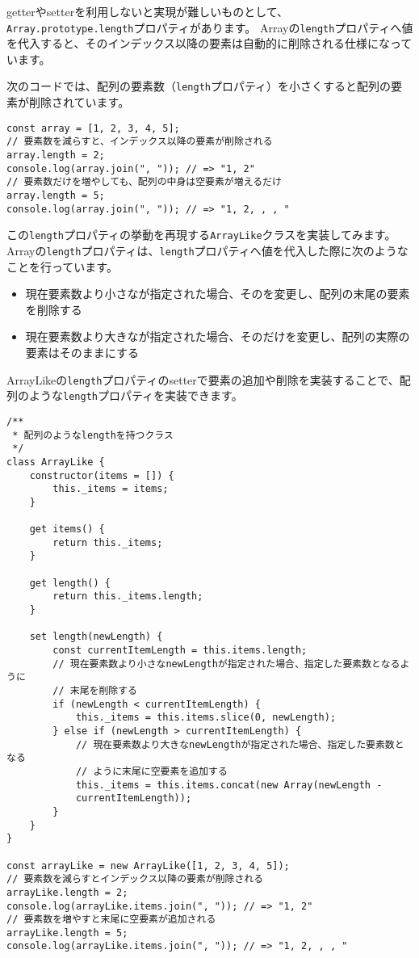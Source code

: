 getterやsetterを利用しないと実現が難しいものとして、\texttt{Array.prototype.length}プロパティがあります。
Arrayの\texttt{length}プロパティへ値を代入すると、そのインデックス以降の要素は自動的に削除される仕様になっています。

次のコードでは、配列の要素数（\texttt{length}プロパティ）を小さくすると配列の要素が削除されています。

\enlargethispage{\baselineskip}\begin{lstlisting}
const array = [1, 2, 3, 4, 5];
// 要素数を減らすと、インデックス以降の要素が削除される
array.length = 2;
console.log(array.join(", ")); // => "1, 2"
// 要素数だけを増やしても、配列の中身は空要素が増えるだけ
array.length = 5;
console.log(array.join(", ")); // => "1, 2, , , "
\end{lstlisting}

この\texttt{length}プロパティの挙動を再現する\texttt{ArrayLike}クラスを実装してみます。
Arrayの\texttt{length}プロパティは、\texttt{length}プロパティへ値を代入した際に次のようなことを行っています。

\begin{itemize}
\item
  現在要素数より小さな\textbf{}が指定された場合、その\textbf{}を変更し、配列の末尾の要素を削除する
\item
  現在要素数より大きな\textbf{}が指定された場合、その\textbf{}だけを変更し、配列の実際の要素はそのままにする
\end{itemize}

ArrayLikeの\texttt{length}プロパティのsetterで要素の追加や削除を実装することで、配列のような\texttt{length}プロパティを実装できます。

\enlargethispage{\baselineskip}\begin{lstlisting}
/**
 * 配列のようなlengthを持つクラス
 */
class ArrayLike {
    constructor(items = []) {
        this._items = items;
    }

    get items() {
        return this._items;
    }

    get length() {
        return this._items.length;
    }

    set length(newLength) {
        const currentItemLength = this.items.length;
        // 現在要素数より小さなnewLengthが指定された場合、指定した要素数となるように
        // 末尾を削除する
        if (newLength < currentItemLength) {
            this._items = this.items.slice(0, newLength);
        } else if (newLength > currentItemLength) {
            // 現在要素数より大きなnewLengthが指定された場合、指定した要素数となる
            // ように末尾に空要素を追加する
            this._items = this.items.concat(new Array(newLength - 
            currentItemLength));
        }
    }
}

const arrayLike = new ArrayLike([1, 2, 3, 4, 5]);
// 要素数を減らすとインデックス以降の要素が削除される
arrayLike.length = 2;
console.log(arrayLike.items.join(", ")); // => "1, 2"
// 要素数を増やすと末尾に空要素が追加される
arrayLike.length = 5;
console.log(arrayLike.items.join(", ")); // => "1, 2, , , "
\end{lstlisting}

